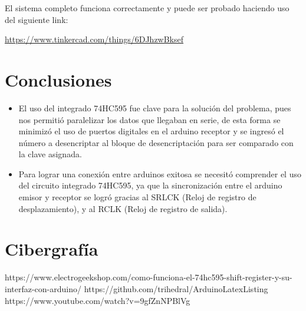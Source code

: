 \documentclass{article}
\begin{document}
El sistema completo funciona correctamente y puede ser probado haciendo uso del siguiente link: 

\url{https://www.tinkercad.com/things/6DJhzwBksef}


\section{Conclusiones} \label{conclusiones}

\begin{itemize}
    \item El uso del integrado 74HC595 fue clave para la solución del problema, pues nos permitió paralelizar los datos que llegaban en serie, de esta forma se minimizó el uso de puertos digitales en el arduino receptor y se ingresó el número a desencriptar al bloque de desencriptación para ser comparado con la clave asignada.
    \item Para lograr una conexión entre arduinos exitosa se necesitó comprender el uso del circuito integrado 74HC595, ya que la sincronización entre el arduino emisor y receptor se logró gracias al SRLCK (Reloj de registro de desplazamiento), y al RCLK (Reloj de registro de salida).
    
    
    
\end{itemize}



\section{Cibergrafía} \label{ciber}

https://www.electrogeekshop.com/como-funciona-el-74hc595-shift-register-y-su-interfaz-con-arduino/
\newline
https://github.com/trihedral/ArduinoLatexListing
\newline
https://www.youtube.com/watch?v=9gfZnNPBlVg
\end{document}
